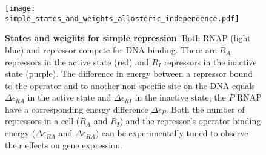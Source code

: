 \begin{figure}[h]
	\centering
	\texttt{[image: simple\_states\_and\_weights\_allosteric\_independence.pdf]} 
	\caption{{\bf States and weights for simple repression}. 
		 Both RNAP
		(light blue) and repressor compete for DNA binding. There are $R_A$ repressors
		in the active state (red) and $R_I$ repressors in the inactive state (purple).
		The difference in energy between a repressor bound to the operator and to
		another non-specific site on the DNA equals $\Delta\epsilon_{RA}$ in the active
		state and $\Delta\epsilon_{RI}$ in the inactive state; the $P$ RNAP have a
		corresponding energy difference $\Delta\epsilon_{P}$. 
		 Both the number of
		repressors in a cell ($R_A$ and $R_I$) and the repressor's operator binding
		energy ($\Delta \varepsilon_{RA}$ and $\Delta \varepsilon_{RA}$) can be
		experimentally tuned to observe their effects on gene expression. 
	} \label{figpolymeraseRepressorStates}
\end{figure}


